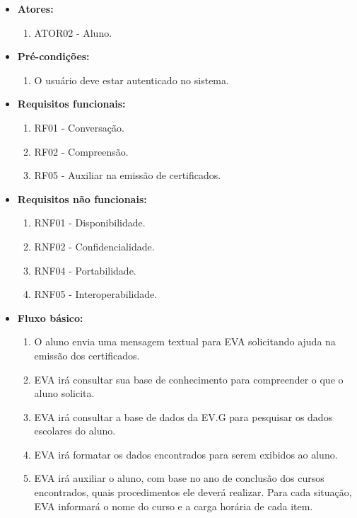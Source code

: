 \begin{itemize}
    \item \textbf{Atores:}
        \begin{enumerate}
            \item ATOR02 - Aluno.
        \end{enumerate}
    \item \textbf{Pré-condições:}
        \begin{enumerate}
            \item O usuário deve estar autenticado no sistema.
        \end{enumerate}
    \item \textbf{Requisitos funcionais:}
        \begin{enumerate}
            \item RF01 - Conversação.
            \item RF02 - Compreensão.
            \item RF05 - Auxiliar na emissão de certificados.
        \end{enumerate}
    \item \textbf{Requisitos não funcionais:}
        \begin{enumerate}
            \item RNF01 - Disponibilidade.
            \item RNF02 - Confidencialidade.
            \item RNF04 - Portabilidade.
            \item RNF05 - Interoperabilidade.
        \end{enumerate}
    \item \textbf{Fluxo básico:}
        \begin{enumerate}
            \item O aluno envia uma mensagem textual para EVA solicitando ajuda na emissão dos certificados.
            \item EVA irá consultar sua base de conhecimento para compreender o que o aluno solicita.
            \item EVA irá consultar a base de dados da EV.G para pesquisar os dados escolares do aluno.
            \item EVA irá formatar os dados encontrados para serem exibidos ao aluno.
            \item EVA irá auxiliar o aluno, com base no ano de conclusão dos cursos encontrados, quais procedimentos ele deverá realizar. Para cada situação, EVA informará o nome do curso e a carga horária de cada item.

\end{enumerate}
\end{itemize}

